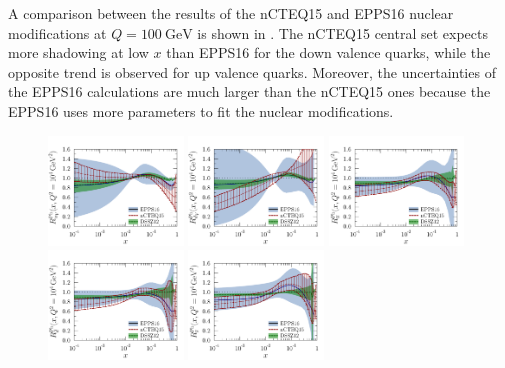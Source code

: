 A comparison between the results of the nCTEQ15 and EPPS16 nuclear modifications at $Q = \SI{100}{\GeV}$ is shown in . The nCTEQ15 central set expects more shadowing at low $x$ than EPPS16 for the down valence quarks, while the opposite trend is observed for up valence quarks. Moreover, the uncertainties of the EPPS16 calculations are much larger than the nCTEQ15 ones because the EPPS16 uses more parameters to fit the nuclear modifications.

\begin{figure}[!htb]
 \centering
 \includegraphics[width=0.32\textwidth]{Figures/WBoson/Theory/EPPS16/Pb_uv_highQ_comp.pdf}
 \includegraphics[width=0.32\textwidth]{Figures/WBoson/Theory/EPPS16/Pb_dv_highQ_comp.pdf}
 \includegraphics[width=0.32\textwidth]{Figures/WBoson/Theory/EPPS16/Pb_us_highQ_comp.pdf}
 \\
 \includegraphics[width=0.32\textwidth]{Figures/WBoson/Theory/EPPS16/Pb_ds_highQ_comp.pdf}
 \includegraphics[width=0.32\textwidth]{Figures/WBoson/Theory/EPPS16/Pb_ss_highQ_comp.pdf}

\end{figure}
